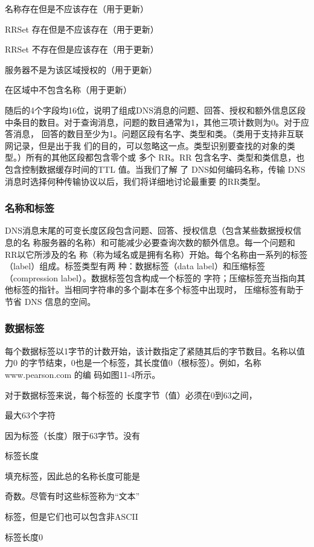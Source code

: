 名称存在但是不应该存在（用于更新）

RRSet 存在但是不应该存在（用于更新）

RRSet 不存在但是应该存在（用于更新）

服务器不是为该区域授权的（用于更新）

在区域中不包含名称（用于更新）

随后的4个字段均16位，说明了组成DNS消息的问题、回答、授权和额外信息区段
中条目的数目。对于查询消息，问题的数目通常为1，其他三项计数则为0。对于应答消息，
回答的数目至少为1。问题区段有名字、类型和类。（类用于支持非互联网记录，但是出于我
们的目的，可以忽略这一点。类型识别要查找的对象的类型。）所有的其他区段都包含零个或
多个 RR。RR 包含名字、类型和类信息，也包含控制数据缓存时间的TTL 值。当我们了解
了 DNS如何编码名称，传输 DNS 消息时选择何种传输协议以后，我们将详细地讨论最重要
的RR类型。

\subsubsection{名称和标签}

DNS消息末尾的可变长度区段包含问题、回答、授权信息（包含某些数据授权信息的名
称服务器的名称）和可能减少必要查询次数的额外信息。每一个问题和 RR以它所涉及的名
称（称为域名或是拥有名称）开始。每个名称由一系列的标签（label）组成。标签类型有两
种：数据标签（data label）和压缩标签（compression label）。数据标签包含构成一个标签的
字符；压缩标签充当指向其他标签的指针。当相同字符串的多个副本在多个标签中出现时，
压缩标签有助于节省 DNS 信息的空间。

\subsubsection{数据标签}

每个数据标签以1字节的计数开始，该计数指定了紧随其后的字节数目。名称以值力0
的字节结束，0也是一个标签，其长度值0（根标签）。例如，名称www.pearson.com 的编
码如图11-4所示。

对于数据标签来说，每个标签的
长度字节（值）必须在0到63之间，

最大63个字符

因为标签（长度）限于63字节。没有

标签长度

填充标签，因此总的名称长度可能是

奇数。尽管有时这些标签称为“文本”

标签，但是它们也可以包含非ASCII

标签长度0

